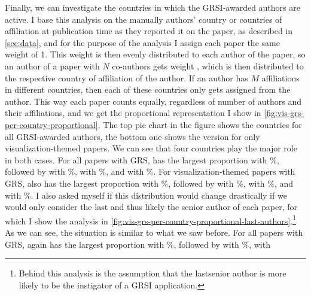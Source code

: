 \documentclass[conference]{vgtc}                     %
\begin{document}
Finally, we can investigate the countries in which the GRSI-awarded authors are active. I base this analysis on the manually authors' country or countries of affiliation at publication time as they reported it on the paper, as described in \autoref{sec:data}, and for the purpose of the analysis I assign each paper the same weight of 1. This weight is then evenly distributed to each author of the paper, so an author of a paper with $N$ co-authors gets weight , which is then distributed to the respective country of affiliation of the author. If an author has $M$ affiliations in different countries, then each of these countries only gets  assigned from the author. This way each paper counts equally, regardless of number of authors and their affiliations, and we get the proportional representation I show in \autoref{fig:vis-grs-per-country-proportional}. The top pie chart in the figure shows the countries for all GRSI-awarded authors, the bottom one shows the version for only visualization-themed papers. We can see that four countries play the major role in both cases. For all papers with GRS, \GrsiCountryPieChartOverallNoOneName{}{} has the largest proportion with \GrsiCountryPieChartOverallNoOnePercentage{}\%, followed by \GrsiCountryPieChartOverallNoTwoName{} with \GrsiCountryPieChartOverallNoTwoPercentage{}\%, \GrsiCountryPieChartOverallNoThreeName{} with \GrsiCountryPieChartOverallNoThreePercentage{}\%, and \GrsiCountryPieChartOverallNoFourName{} with \GrsiCountryPieChartOverallNoFourPercentage{}\%. For visualization-themed papers with GRS, \GrsiCountryPieChartVisNoOneName{} also has the largest proportion with \GrsiCountryPieChartVisNoOnePercentage{}\%, followed by \GrsiCountryPieChartVisNoTwoName{} with \GrsiCountryPieChartVisNoTwoPercentage{}\%, \GrsiCountryPieChartVisNoThreeName{} with \GrsiCountryPieChartVisNoThreePercentage{}\%, and \GrsiCountryPieChartVisNoFourName{} with \GrsiCountryPieChartVisNoFourPercentage{}\%. I also asked myself if this distribution would change drastically if we would only consider the last and thus likely the senior author of each paper, for which I show the analysis in \autoref{fig:vis-grs-per-country-proportional-last-authors}.\footnote{Behind this analysis is the assumption that the last\discretionary{/}{}{/}senior author is more likely to be the instigator of a GRSI application.} As we can see, the situation is similar to what we saw before. For all papers with GRS, \GrsiCountryPieChartOverallSeniorNoOneName{}{} again has the largest proportion with \GrsiCountryPieChartOverallSeniorNoOnePercentage{}\%, followed by \GrsiCountryPieChartOverallSeniorNoTwoName{} with \GrsiCountryPieChartOverallSeniorNoTwoPercentage{}\%, \GrsiCountryPieChartOverallSeniorNoThreeName{} with 
\end{document}

